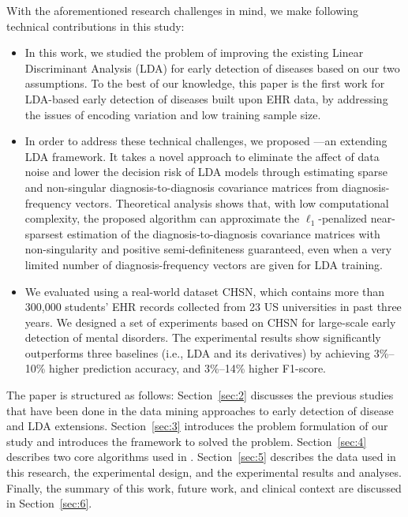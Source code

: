 %
With the aforementioned research challenges in mind, we make following technical contributions in this study:
%
\begin{itemize}
    \item In this work, we studied the problem of improving the existing Linear Discriminant Analysis (LDA) for early detection of diseases based on our two assumptions.
To the best of our knowledge, this paper is the first work for LDA-based early detection of diseases built upon EHR data, by addressing the issues of encoding variation and low training sample size.


\item In order to address these technical challenges, we proposed \TheName{}---an extending LDA framework.
It takes a novel approach to eliminate the affect of data noise and lower the decision risk of LDA models  through estimating sparse and non-singular diagnosis-to-diagnosis covariance matrices from diagnosis-frequency vectors.
Theoretical analysis shows that, with low computational complexity, the proposed algorithm can approximate the $\ell_1$-penalized near-sparsest estimation of the diagnosis-to-diagnosis covariance matrices with non-singularity and positive semi-definiteness guaranteed, even when a very limited number of diagnosis-frequency vectors are given for LDA training.


\item We evaluated \TheName{} using a real-world dataset CHSN,  which contains more than 300,000 students' EHR records collected from 23 US universities in past three years.
We designed a set of experiments based on CHSN for large-scale early detection of mental disorders.
The experimental results show \TheName{} significantly outperforms three baselines (i.e., LDA and its derivatives) by achieving 3\%--10\% higher prediction accuracy, and 3\%--14\% higher F1-score.


\end{itemize}

The paper is structured as follows: Section~\ref{sec:2} discusses the previous studies that have been done in the data mining approaches to early detection of disease and LDA extensions.
Section~\ref{sec:3} introduces the problem formulation of our study and introduces the \TheName{} framework to solved the problem.
Section~\ref{sec:4} describes two core algorithms used in \TheName{}.
Section~\ref{sec:5} describes the data used in this research, the experimental design, and the experimental results and analyses.
Finally, the summary of this work, future work, and clinical context are discussed in Section~\ref{sec:6}.
 

